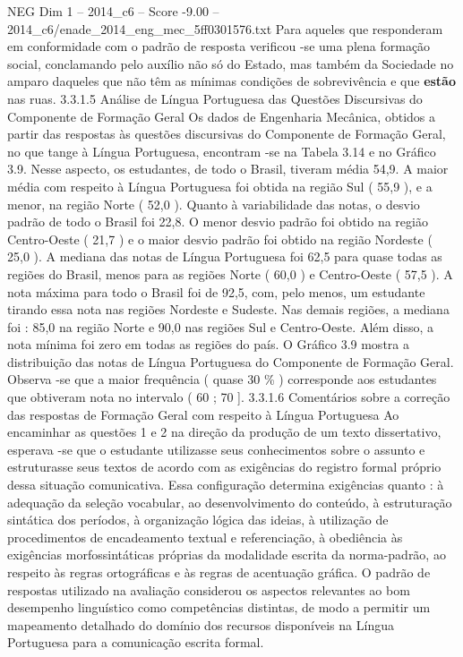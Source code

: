 \begin{textsample}{NEG Dim 1 – 2014\_c6 – Score -9.00 – 2014\_c6/enade\_2014\_eng\_mec\_5ff0301576.txt}
Para aqueles que responderam em conformidade com o padrão de resposta verificou -se uma plena formação social, conclamando pelo auxílio não só do Estado, mas também da Sociedade no amparo daqueles que não têm as mínimas condições de sobrevivência e que \textbf{estão} nas ruas. 3.3.1.5 Análise de Língua Portuguesa das Questões Discursivas do Componente de Formação Geral Os dados de Engenharia Mecânica, obtidos a partir das respostas às questões discursivas do Componente de Formação Geral, no que tange à Língua Portuguesa, encontram -se na Tabela 3.14 e no Gráfico 3.9.
Nesse aspecto, os estudantes, de todo o Brasil, tiveram média 54,9.
A maior média com respeito à Língua Portuguesa foi obtida na região Sul ( 55,9 ), e a menor, na região Norte ( 52,0 ).
Quanto à variabilidade das notas, o desvio padrão de todo o Brasil foi 22,8.
O menor desvio padrão foi obtido na região Centro-Oeste ( 21,7 ) e o maior desvio padrão foi obtido na região Nordeste ( 25,0 ).
A mediana das notas de Língua Portuguesa foi 62,5 para quase todas as regiões do Brasil, menos para as regiões Norte ( 60,0 ) e Centro-Oeste ( 57,5 ).
A nota máxima para todo o Brasil foi de 92,5, com, pelo menos, um estudante tirando essa nota nas regiões Nordeste e Sudeste.
Nas demais regiões, a mediana foi : 85,0 na região Norte e 90,0 nas regiões Sul e Centro-Oeste.
Além disso, a nota mínima foi zero em todas as regiões do país.
O Gráfico 3.9 mostra a distribuição das notas de Língua Portuguesa do Componente de Formação Geral.
Observa -se que a maior frequência ( quase 30 \% ) corresponde aos estudantes que obtiveram nota no intervalo ( 60 ; 70 ]. 3.3.1.6 Comentários sobre a correção das respostas de Formação Geral com respeito à Língua Portuguesa Ao encaminhar as questões 1 e 2 na direção da produção de um texto dissertativo, esperava -se que o estudante utilizasse seus conhecimentos sobre o assunto e estruturasse seus textos de acordo com as exigências do registro formal próprio dessa situação comunicativa.
Essa configuração determina exigências quanto : à adequação da seleção vocabular, ao desenvolvimento do conteúdo, à estruturação sintática dos períodos, à organização lógica das ideias, à utilização de procedimentos de encadeamento textual e referenciação, à obediência às exigências morfossintáticas próprias da modalidade escrita da norma-padrão, ao respeito às regras ortográficas e às regras de acentuação gráfica.
O padrão de respostas utilizado na avaliação considerou os aspectos relevantes ao bom desempenho linguístico como competências distintas, de modo a permitir um mapeamento detalhado do domínio dos recursos disponíveis na Língua Portuguesa para a comunicação escrita formal.

\end{textsample}
